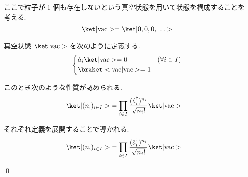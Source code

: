 \documentclass[uplatex,dvipdfmx,a4paper,11pt]{jlreq}
\makeatletter
\numberwithin{equation}{section}
\theoremstyle{definition}
\renewenvironment{proof}[1][\proofname]{\par
  \normalfont
  \topsep6\p@\@plus6\p@ \trivlist
  \item[\hskip\labelsep{\bfseries #1}\@addpunct{\bfseries}]\ignorespaces\quad\par
}{
  \qed\endtrivlist\@endpefalse
}
\renewcommand\proofname{証明}
\makeatother
\begin{document}
ここで粒子が 1 個も存在しないという真空状態を用いて状態を構成することを考える.
\begin{align}
  \ket|\mathrm{vac}> = \ket|0,0,0,\ldots>
\end{align}
\begin{definition}
  真空状態 $\ket|\mathrm{vac}>$ を次のように定義する.
  \begin{align}
    \begin{dcases}
      \hat{a}_i\ket|\mathrm{vac}> = 0 & (\forall i\in I) \\
      \braket<\mathrm{vac}|\mathrm{vac}> = 1
    \end{dcases}
  \end{align}
\end{definition}
\begin{proposition}[Q21-40(i)(ii)]
  このとき次のような性質が認められる.
  \begin{align}
    \ket|(n_i)_{i\in I}> & = \prod_{i\in I}\frac{(\hat{a}_i^\dagger)^{n_i}}{\sqrt{n_i!}}\ket|\mathrm{vac}>
  \end{align}
\end{proposition}
\begin{proof}
  それぞれ定義を展開することで導かれる.
  \begin{align}
    \ket|(n_i)_{i\in I}> & = \prod_{i\in I}\frac{(\hat{a}_i^\dagger)^{n_i}}{\sqrt{n_i!}}\ket|\mathrm{vac}>
  \end{align}
\end{proof}
\end{document}
